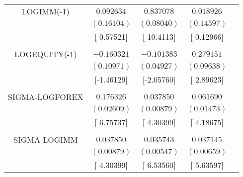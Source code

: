 \begin{tabular}{lrrrr}
\multicolumn{1}{c}{LOGIMM(-1)}&\multicolumn{1}{c}{$0.092634$}&\multicolumn{1}{c}{$0.837078$}&\multicolumn{1}{c}{$0.018926$}&\multicolumn{1}{c}{}\\
\multicolumn{1}{c}{}&\multicolumn{1}{c}{$(0.16104)$}&\multicolumn{1}{c}{$(0.08040)$}&\multicolumn{1}{c}{$(0.14597)$}&\multicolumn{1}{c}{}\\
\multicolumn{1}{c}{}&\multicolumn{1}{c}{[ 0.57521]}&\multicolumn{1}{c}{[ 10.4113]}&\multicolumn{1}{c}{[ 0.12966]}&\multicolumn{1}{c}{}\\
\multicolumn{1}{c}{}&\multicolumn{1}{c}{}&\multicolumn{1}{c}{}&\multicolumn{1}{c}{}&\multicolumn{1}{c}{}\\
\multicolumn{1}{c}{LOGEQUITY(-1)}&\multicolumn{1}{c}{$-0.160321$}&\multicolumn{1}{c}{$-0.101383$}&\multicolumn{1}{c}{$0.279151$}&\multicolumn{1}{c}{}\\
\multicolumn{1}{c}{}&\multicolumn{1}{c}{$(0.10971)$}&\multicolumn{1}{c}{$(0.04927)$}&\multicolumn{1}{c}{$(0.09638)$}&\multicolumn{1}{c}{}\\
\multicolumn{1}{c}{}&\multicolumn{1}{c}{[-1.46129]}&\multicolumn{1}{c}{[-2.05760]}&\multicolumn{1}{c}{[ 2.89623]}&\multicolumn{1}{c}{}\\
\multicolumn{1}{c}{}&\multicolumn{1}{c}{}&\multicolumn{1}{c}{}&\multicolumn{1}{c}{}&\multicolumn{1}{c}{}\\
\multicolumn{1}{c}{SIGMA-LOGFOREX}&\multicolumn{1}{c}{$0.176326$}&\multicolumn{1}{c}{$0.037850$}&\multicolumn{1}{c}{$0.061690$}&\multicolumn{1}{c}{}\\
\multicolumn{1}{c}{}&\multicolumn{1}{c}{$(0.02609)$}&\multicolumn{1}{c}{$(0.00879)$}&\multicolumn{1}{c}{$(0.01473)$}&\multicolumn{1}{c}{}\\
\multicolumn{1}{c}{}&\multicolumn{1}{c}{[ 6.75737]}&\multicolumn{1}{c}{[ 4.30399]}&\multicolumn{1}{c}{[ 4.18675]}&\multicolumn{1}{c}{}\\
\multicolumn{1}{c}{}&\multicolumn{1}{c}{}&\multicolumn{1}{c}{}&\multicolumn{1}{c}{}&\multicolumn{1}{c}{}\\
\multicolumn{1}{c}{SIGMA-LOGIMM}&\multicolumn{1}{c}{$0.037850$}&\multicolumn{1}{c}{$0.035743$}&\multicolumn{1}{c}{$0.037145$}&\multicolumn{1}{c}{}\\
\multicolumn{1}{c}{}&\multicolumn{1}{c}{$(0.00879)$}&\multicolumn{1}{c}{$(0.00547)$}&\multicolumn{1}{c}{$(0.00659)$}&\multicolumn{1}{c}{}\\
\multicolumn{1}{c}{}&\multicolumn{1}{c}{[ 4.30399]}&\multicolumn{1}{c}{[ 6.53560]}&\multicolumn{1}{c}{[ 5.63597]}&\multicolumn{1}{c}{}\\

\end{tabular}
